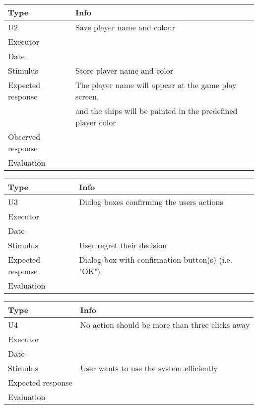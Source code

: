 \vspace{0.5em}

\noindent
\begin{tabular}{|p{3cm}|p{8.5cm}|}
	\hline
	\bf{Type}	& \bf{Info} \\
	\hline
	U2			& Save player name and colour \\
	Executor	&  \\
	Date		& \date{\today} \\
	Stimulus	& Store player name and color \\
	Expected response & The player name will appear at the game play screen, \\
             & and the ships will be painted in the predefined player color  \\
	Observed response & \\
	Evaluation	&  \\
	\hline
\end{tabular}

\vspace{0.5em}

\noindent
\begin{tabular}{|p{3cm}|p{8.5cm}|}
	\hline
	\bf{Type}	& \bf{Info} \\
	\hline
	U3			& Dialog boxes confirming the users actions \\
	Executor	&  \\
	Date		& \date{\today} \\
	Stimulus	& User regret their decision \\
	Expected response & Dialog box with confirmation button(s) (i.e. "OK")\\
	Evaluation	&  \\
	\hline
\end{tabular}

\vspace{0.5em}

\noindent
\begin{tabular}{|p{3cm}|p{8.5cm}|}
	\hline
	\bf{Type}	& \bf{Info} \\
	\hline
	U4			& No action should be more than three clicks away \\
	Executor	&  \\
	Date		& \date{\today} \\
	Stimulus	& User wants to use the system efficiently \\
	Expected response &  \\
	Evaluation	&  \\
	\hline
\end{tabular}

